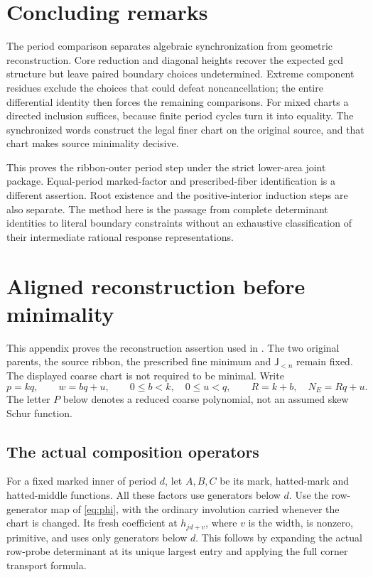 \documentclass[11pt,a4paper]{amsart}
\numberwithin{equation}{section}
\theoremstyle{plain}
\theoremstyle{definition}
\newcommand{\Jlower}{\mathsf J_{<n}}
\begin{document}
\section*{Concluding remarks}
The period comparison separates algebraic synchronization from geometric
reconstruction.  Core reduction and diagonal heights recover the expected
gcd structure but leave paired boundary choices undetermined.  Extreme
component residues exclude the choices that could defeat noncancellation;
the entire differential identity then forces the remaining comparisons.
For mixed charts a directed inclusion suffices, because finite period
cycles turn it into equality.  The synchronized words construct the legal
finer chart on the original source, and that chart makes source minimality
decisive.

This proves the ribbon-outer period step under the strict lower-area joint
package.  Equal-period marked-factor and prescribed-fiber identification is
a different assertion.  Root existence and the positive-interior induction
steps are also separate.  The method here is the
passage from complete determinant identities to literal boundary
constraints without an exhaustive classification of their intermediate
rational response representations.


\appendix
\section{Aligned reconstruction before minimality}\label{app:aligned}

This appendix proves the reconstruction assertion used in
.  The two original parents, the source
ribbon, the prescribed fine minimum and \(\Jlower\) remain fixed.  The displayed
coarse chart is not required to be minimal.  Write
\[
 p=kq,\qquad w=bq+u,\qquad 0\le b<k,\quad0\le u<q,
 \qquad R=k+b,\quad N_E=Rq+u.
\]
The letter \(P\) below denotes a reduced coarse polynomial, not an assumed
skew Schur function.

\subsection{The actual composition operators}

For a fixed marked inner of period \(d\), let \(A,B,C\) be its mark, hatted-mark
and hatted-middle functions.  All these factors use generators below \(d\).
Use the row-generator map of \eqref{eq:phi}, with the ordinary involution
carried whenever the chart is changed.  Its fresh coefficient at \(h_{jd+v}\),
where \(v\) is the width, is nonzero, primitive, and uses only generators below
\(d\).  This follows by expanding the actual row-probe determinant at its
unique largest entry and applying the full corner transport formula.
\end{document}
